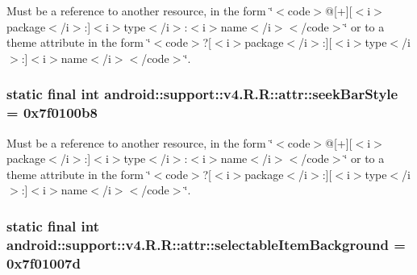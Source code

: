 Must be a reference to another resource, in the form \char`\"{}$<$code$>$@\mbox{[}+\mbox{]}\mbox{[}$<$i$>$package$<$/i$>$:\mbox{]}$<$i$>$type$<$/i$>$:$<$i$>$name$<$/i$>$$<$/code$>$\char`\"{} or to a theme attribute in the form \char`\"{}$<$code$>$?\mbox{[}$<$i$>$package$<$/i$>$:\mbox{]}\mbox{[}$<$i$>$type$<$/i$>$:\mbox{]}$<$i$>$name$<$/i$>$$<$/code$>$\char`\"{}. \hypertarget{classandroid_1_1support_1_1v4_1_1_r_1_1attr_17f7dba9469994c3c6cf6b6d0fa63276}{
\subsubsection[{seekBarStyle}]{\setlength{\rightskip}{0pt plus 5cm}static final int android::support::v4.R.R::attr::seekBarStyle = 0x7f0100b8}}
\label{classandroid_1_1support_1_1v4_1_1_r_1_1attr_17f7dba9469994c3c6cf6b6d0fa63276}


Must be a reference to another resource, in the form \char`\"{}$<$code$>$@\mbox{[}+\mbox{]}\mbox{[}$<$i$>$package$<$/i$>$:\mbox{]}$<$i$>$type$<$/i$>$:$<$i$>$name$<$/i$>$$<$/code$>$\char`\"{} or to a theme attribute in the form \char`\"{}$<$code$>$?\mbox{[}$<$i$>$package$<$/i$>$:\mbox{]}\mbox{[}$<$i$>$type$<$/i$>$:\mbox{]}$<$i$>$name$<$/i$>$$<$/code$>$\char`\"{}. \hypertarget{classandroid_1_1support_1_1v4_1_1_r_1_1attr_d9db3dee6d2010909cc30dd89afd3c27}{
\subsubsection[{selectableItemBackground}]{\setlength{\rightskip}{0pt plus 5cm}static final int android::support::v4.R.R::attr::selectableItemBackground = 0x7f01007d}}
\label{classandroid_1_1support_1_1v4_1_1_r_1_1attr_d9db3dee6d2010909cc30dd89afd3c27}


